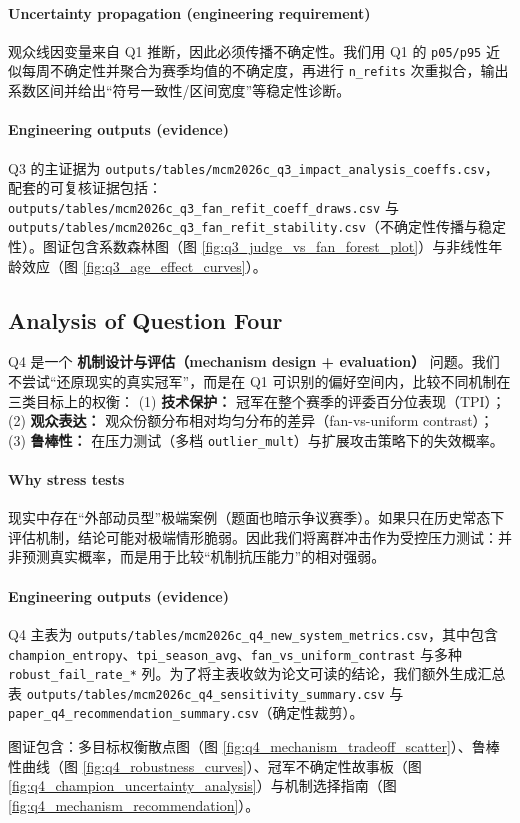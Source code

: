 \paragraph{Uncertainty propagation (engineering requirement)}
观众线因变量来自 Q1 推断，因此必须传播不确定性。我们用 Q1 的 \texttt{p05/p95} 近似每周不确定性并聚合为赛季均值的不确定度，再进行 \texttt{n\_refits} 次重拟合，输出系数区间并给出“符号一致性/区间宽度”等稳定性诊断。

\paragraph{Engineering outputs (evidence)}
Q3 的主证据为 \texttt{outputs/tables/mcm2026c\_q3\_impact\_analysis\_coeffs.csv}，配套的可复核证据包括：
\texttt{outputs/tables/mcm2026c\_q3\_fan\_refit\_coeff\_draws.csv} 与 \texttt{outputs/tables/mcm2026c\_q3\_fan\_refit\_stability.csv}（不确定性传播与稳定性）。图证包含系数森林图（图 \ref{fig:q3_judge_vs_fan_forest_plot}）与非线性年龄效应（图 \ref{fig:q3_age_effect_curves}）。

\subsection{Analysis of Question Four}

Q4 是一个 \textbf{机制设计与评估（mechanism design + evaluation）} 问题。我们不尝试“还原现实的真实冠军”，而是在 Q1 可识别的偏好空间内，比较不同机制在三类目标上的权衡：
(1) \textbf{技术保护：} 冠军在整个赛季的评委百分位表现（TPI）；
(2) \textbf{观众表达：} 观众份额分布相对均匀分布的差异（fan-vs-uniform contrast）；
(3) \textbf{鲁棒性：} 在压力测试（多档 \texttt{outlier\_mult}）与扩展攻击策略下的失效概率。

\paragraph{Why stress tests}
现实中存在“外部动员型”极端案例（题面也暗示争议赛季）。如果只在历史常态下评估机制，结论可能对极端情形脆弱。因此我们将离群冲击作为受控压力测试：并非预测真实概率，而是用于比较“机制抗压能力”的相对强弱。

\paragraph{Engineering outputs (evidence)}
Q4 主表为 \texttt{outputs/tables/mcm2026c\_q4\_new\_system\_metrics.csv}，其中包含 \texttt{champion\_entropy}、\texttt{tpi\_season\_avg}、\texttt{fan\_vs\_uniform\_contrast} 与多种 \texttt{robust\_fail\_rate\_*} 列。为了将主表收敛为论文可读的结论，我们额外生成汇总表 \texttt{outputs/tables/mcm2026c\_q4\_sensitivity\_summary.csv} 与 \texttt{paper\_q4\_recommendation\_summary.csv}（确定性裁剪）。

图证包含：多目标权衡散点图（图 \ref{fig:q4_mechanism_tradeoff_scatter}）、鲁棒性曲线（图 \ref{fig:q4_robustness_curves}）、冠军不确定性故事板（图 \ref{fig:q4_champion_uncertainty_analysis}）与机制选择指南（图 \ref{fig:q4_mechanism_recommendation}）。
